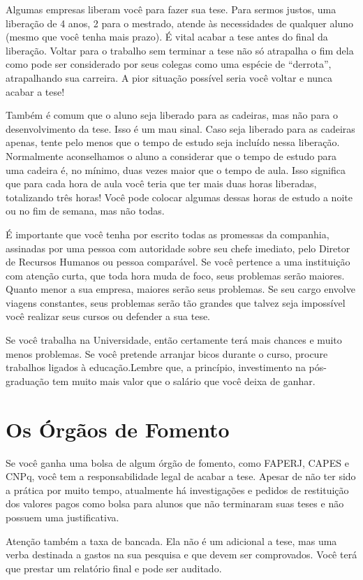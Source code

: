 Algumas empresas liberam você para fazer sua tese. Para sermos justos, uma liberação de 4 anos, 2 para o mestrado, atende às necessidades de qualquer aluno (mesmo que você tenha mais prazo). É vital acabar a tese antes do final da liberação. Voltar para o trabalho sem terminar a tese não só atrapalha o fim dela como pode ser considerado por seus colegas como uma espécie de “derrota”, atrapalhando sua carreira. A pior situação possível seria você voltar e nunca acabar a tese! 

Também é comum que o aluno seja liberado para as cadeiras, mas não para o desenvolvimento da tese. Isso é um mau sinal. Caso seja liberado para as cadeiras apenas, tente pelo menos que o tempo de estudo seja incluído nessa liberação. Normalmente aconselhamos o aluno a considerar que o tempo de estudo para uma cadeira é, no mínimo, duas vezes maior que o tempo de aula. Isso significa que para cada hora de aula você teria que ter mais duas horas liberadas, totalizando três horas! Você pode colocar algumas dessas horas de estudo a noite ou no fim de semana, mas não todas.

É importante que você tenha por escrito todas as promessas da companhia, assinadas por uma pessoa com autoridade sobre seu chefe imediato, pelo Diretor de Recursos Humanos ou pessoa comparável.
Se você pertence a uma instituição com atenção curta, que toda hora muda de foco, seus problemas serão maiores. Quanto menor a sua empresa, maiores serão seus problemas. Se seu cargo envolve viagens constantes, seus problemas serão tão grandes que talvez seja impossível você realizar seus cursos ou defender a sua tese.

Se você trabalha na Universidade, então certamente terá mais chances e muito menos problemas. Se você pretende arranjar bicos durante o curso, procure trabalhos ligados à educação.Lembre que, a princípio, investimento na pós-graduação tem muito mais valor que o salário que você deixa de ganhar. 

\section{Os Órgãos de Fomento}

Se você ganha uma bolsa de algum órgão de fomento, como FAPERJ, CAPES e CNPq, você tem a responsabilidade legal de acabar a tese. 
Apesar de não ter sido a prática por muito tempo, atualmente há investigações e pedidos de restituição dos valores pagos como bolsa para alunos que não terminaram suas teses e não possuem uma justificativa.

Atenção também a taxa de bancada. Ela não é um adicional a tese, mas uma verba destinada a gastos na sua pesquisa e que devem ser comprovados. Você terá que prestar um relatório final e pode ser auditado.



